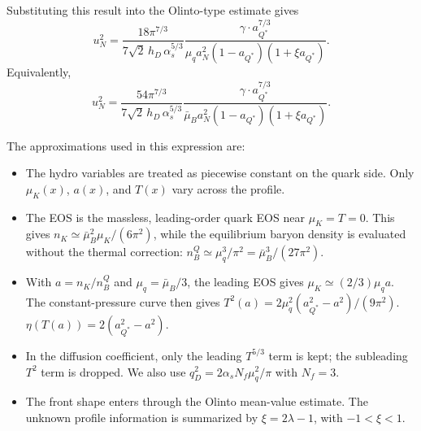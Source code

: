 \documentclass[11pt]{article}
\begin{document}
Substituting this result into the Olinto-type estimate gives
\begin{equation}
u_N^2
=
\frac{
18\pi^{7/3}
}{
7\sqrt{2}\,h_D\,\alpha_s^{5/3}
}
\frac{\gamma\cdot 
a_{Q^*}^{7/3}
}{
\mu_q a_N^2(1-a_{Q^*})(1+\xi a_{Q^*})
}.
\end{equation}
Equivalently,
\begin{equation}
\boxed{
u_N^2
=
\frac{
54\pi^{7/3}
}{
7\sqrt{2}\,h_D\,\alpha_s^{5/3}
}
\frac{\gamma\cdot 
a_{Q^*}^{7/3}
}{
\bar\mu_B a_N^2(1-a_{Q^*})(1+\xi a_{Q^*})
}.
}
\end{equation}

The approximations used in this expression are:
\begin{itemize}
\item The hydro variables are treated as piecewise constant on the quark side.
Only \(\mu_K(x)\), \(a(x)\), and \(T(x)\) vary across the profile.
\item The EOS is the massless, leading-order quark EOS near
\(\mu_K=T=0\). This gives
\(n_K\simeq \bar\mu_B^2\mu_K/(6\pi^2)\), while the equilibrium baryon
density is evaluated without the thermal correction:
\(n_B^Q\simeq \mu_q^3/\pi^2=\bar\mu_B^3/(27\pi^2)\).
\item With \(a=n_K/n_B^Q\) and \(\mu_q=\bar\mu_B/3\), the leading EOS gives
\(\mu_K\simeq (2/3)\mu_qa\). The constant-pressure curve then gives
\(T^2(a)=2\mu_q^2(a_{Q^*}^2-a^2)/(9\pi^2)\).
%
\(\eta(T(a))=2(a_{Q^*}^2-a^2)\).
\item In the diffusion coefficient, only the leading \(T^{5/3}\) term is kept;
the subleading \(T^2\) term is dropped. We also use
\(q_D^2=2\alpha_sN_f\mu_q^2/\pi\) with \(N_f=3\).
\item The front shape enters through the Olinto mean-value estimate. The
unknown profile information is summarized by \(\xi=2\lambda-1\), with
\(-1<\xi<1\).
\end{itemize}
\end{document}
